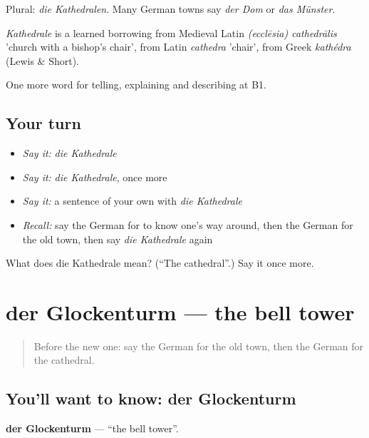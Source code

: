 Plural: \emph{die Kathedralen}. Many German towns say \emph{der Dom} or \emph{das Münster}.

\begin{cousinweb}
\emph{Kathedrale} is a learned borrowing from Medieval Latin \emph{(ecclēsia) cathedrālis} 'church with a bishop's chair', from Latin \emph{cathedra} 'chair', from Greek \emph{kathédra} (Lewis \& Short).
\end{cousinweb}

\begin{grammarlens}[title={What you've built}]
One more word for telling, explaining and describing at B1.
\end{grammarlens}

\subsection*{Your turn}
\begin{itemize}
\raggedright
  \item \emph{Say it:} \emph{die Kathedrale}
  \item \emph{Say it:} \emph{die Kathedrale}, once more
  \item \emph{Say it:} a sentence of your own with \emph{die Kathedrale}
  \item \emph{Recall:} say the German for to know one's way around, then the German for the old town, then say \emph{die Kathedrale} again
\end{itemize}

\begin{tcolorbox}[breakable,colback=teal!4,colframe=teal!35!black,title={Before you move on}]
What does die Kathedrale mean? (\textquotedblleft{}The cathedral\textquotedblright{}.) Say it once more.
\end{tcolorbox}
\section[der Glockenturm]{der Glockenturm — the bell tower}

\label{lesson:GE-C438-glockenturm}



\begin{quote}
Before the new one: say the German for the old town, then the German for the cathedral.
\end{quote}

\subsection*{You'll want to know: der Glockenturm}
\textbf{der Glockenturm} — \textquotedblleft{}the bell tower\textquotedblright{}.

